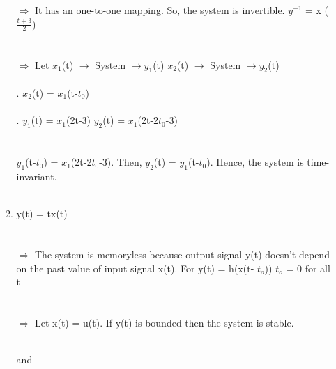 \documentclass[10pt,a4paper, margin=1in]{article}
\begin{document}
\begin{enumerate}
\begin{enumerate}
    $\Rightarrow$ It has an one-to-one mapping. So, the system is invertible. \hspace{2cm} $y^{-1}$ = x ($\frac{t+3}{2}$)\\\\\\
    $\Rightarrow$ Let $x_{1}$(t) $\rightarrow$  System $\rightarrow y_{1}$(t) \hspace{5cm} $x_{2}$(t) $\rightarrow$  System $\rightarrow y_{2}$(t)\\\\
    .\hspace{10.3cm} $x_{2}$(t) = $x_{1}$(t-$t_{0}$)\\\\
    .\hspace{0.7cm} $y_{1}$(t) = $x_{1}$(2t-3) \hspace{6.7cm} $y_{2}$(t) = $x_{1}$(2t-2$t_{0}$-3)\\\\\\
    $y_{1}$(t-$t_{0}$) = $x_{1}$(2t-2$t_{0}$-3). Then, $y_{2}$(t) =  $y_{1}$(t-$t_{0}$). Hence, the system is time-invariant.\\\\
    
    \item %
    y(t) = tx(t)\\\\\\
    $\Rightarrow$ The system is memoryless because output signal y(t) doesn't depend on the past value of input signal x(t). For y(t) = h(x(t- $t_{o}$)) $t_{o}$ = 0 for all t\\\\\\
    $\Rightarrow$ Let x(t) = u(t). If y(t) is bounded then the system is stable.\\\\
    \hspace{2cm} and \hspace{2cm}
     \begin{tikzpicture}[domain=0:2.5] 
    

\end{tikzpicture}
\end{enumerate}
\end{enumerate}
\end{document}
